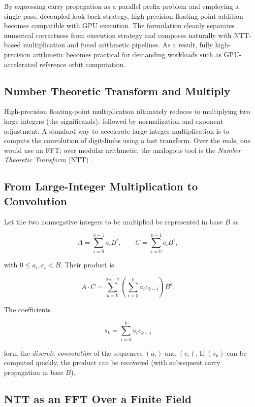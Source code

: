 By expressing carry propagation as a parallel prefix problem and employing a
single-pass, decoupled look-back strategy, high-precision floating-point
addition becomes compatible with GPU execution. The formulation cleanly
separates numerical correctness from execution strategy and composes naturally
with NTT-based multiplication and fused arithmetic pipelines. As a result,
fully high-precision arithmetic becomes practical for demanding workloads such
as GPU-accelerated reference orbit computation.


\subsection{Number Theoretic Transform and Multiply}
\label{sec:ntt-multiply}

High-precision floating-point multiplication ultimately reduces to multiplying
two large integers (the significands), followed by normalization and exponent
adjustment. A standard way to accelerate large-integer multiplication is to
compute the convolution of digit-limbs using a fast transform. Over the reals,
one would use an FFT; over modular arithmetic, the analogous tool is the
\emph{Number Theoretic Transform} (NTT) \cite{NTT_Wikipedia,NTT_BeginnerGuide2024}.

\subsection{From Large-Integer Multiplication to Convolution}

Let the two nonnegative integers to be multiplied be represented in base $B$ as

\[
A = \sum_{i=0}^{n-1} a_i B^i,\qquad
C = \sum_{i=0}^{n-1} c_i B^i,
\]

with $0 \le a_i, c_i < B$. Their product is

\[
A\cdot C = \sum_{k=0}^{2n-2} \left(\sum_{i=0}^{k} a_i c_{k-i}\right) B^k.
\]

The coefficients

\[
s_k = \sum_{i=0}^{k} a_i c_{k-i}
\]

form the \emph{discrete convolution} of the sequences $(a_i)$ and $(c_i)$. If
$(s_k)$ can be computed quickly, the product can be recovered (with subsequent
carry propagation in base $B$).

\subsection{NTT as an FFT Over a Finite Field}


